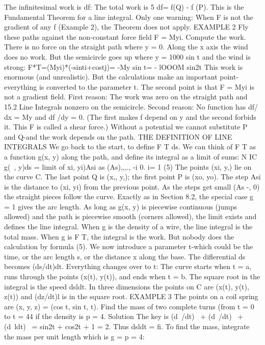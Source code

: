 The infinitesimal work is df: The total work is 5 df= f(Q) - f (P). This is the Fundamental
Theorem for a line integral. Only one warning: When F is not the gradient of any
f (Example 2), the Theorem does not apply.
EXAMPLE 2 Fly these paths against the non-constant force field F = Myi. Compute
the work.
There is no force on the straight path where y = 0. Along the x axis the wind does
no work. But the semicircle goes up where y = 1000 sin t and the wind is strong:
F*T=(Myi)*(-sinti+costj)= -My sin t= - lOOOM sin2t
This work is enormous (and unrealistic). But the calculations make an important
point-everything is converted to the parameter t. The second point is that F = Myi
is not a gradient field. First reason: The work was zero on the straight path and 
15.2 Line Integrals
nonzero on the semicircle. Second reason: No function has df/ dx = My and df /dy =
0. (The first makes f depend on y and the second forbids it. This F is called a shear
force.) Without a potential we cannot substitute P and Q-and the work depends
on the path.
THE DEFINITION OF LINE INTEGRALS
We go back to the start, to define F T ds. We can think of F T as a function g(x, y)
along the path, and define its integral as a limit of sums:
N IC g(~, y)ds = limit of xi, yi)Asi as (As),,,., -i 0.
i= 1 (5)
The points (xi, y,) lie on the curve C. The last point Q is (x,, y,); the first point P is
(xo, yo). The step Asi is the distance to (xi, yi) from the previous point. As the steps
get small (As -, 0) the straight pieces follow the curve. Exactly as in Section 8.2, the
special case g = 1 gives the arc length. As long as g(x, y) is piecewise continuous
(jumps allowed) and the path is piecewise smooth (corners allowed), the limit exists
and defines the line integral.
When g is the density of a wire, the line integral is the total mass. When g is F T,
the integral is the work. But nobody does the calculation by formula (5). We now
introduce a parameter t-which could be the time, or the arc length s, or the distance
x along the base.
The diflerential ds becomes (ds/dt)dt. Everything changes over to t:
The curve starts when t = a, runs through the points (x(t), y(t)), and ends when t = b.
The square root in the integral is the speed dsldt. In three dimensions the points on
C are (x(t), y(t), z(t)) and (dz/dt)l is in the square root.
EXAMPLE 3 The points on a coil spring are (x, y, z) = (cos t, sin t, t). Find the mass
of two complete turns (from t = 0 to t = 44 if the density is p = 4.
Solution The key is (d~/dt)~ + (d~/dt)~ + (d~ldt)~ = sin2t + cos2t + 1 = 2. Thus
dsldt = fi. To find the mass, integrate the mass per unit length which is g = p = 4:
